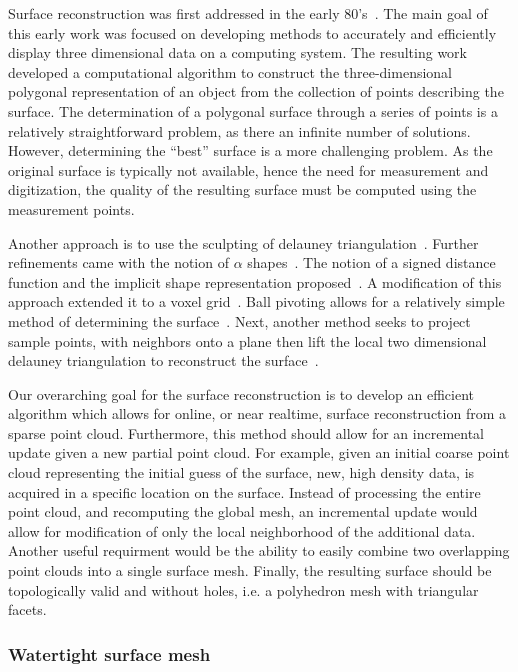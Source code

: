 Surface reconstruction was first addressed in the early 80's~\cite{uselton1983,uselton1981}.
The main goal of this early work was focused on developing methods to accurately and efficiently display three dimensional data on a computing system.
The resulting work developed a computational algorithm to construct the three-dimensional polygonal representation of an object from the collection of points describing the surface.
The determination of a polygonal surface through a series of points is a relatively straightforward problem, as there an infinite number of solutions.
However, determining the ``best'' surface is a more challenging problem.
As the original surface is typically not available, hence the need for measurement and digitization, the quality of the resulting surface must be computed using the measurement points.

Another approach is to use the sculpting of delauney triangulation~\cite{boissonnat1984}.
Further refinements came with the notion of \( \alpha \) shapes~\cite{edelsbrunner1994}.
The notion of a signed distance function and the implicit shape representation proposed~\cite{hoppe1992}.
A modification of this approach extended it to a voxel grid~\cite{curless1996}.
Ball pivoting allows for a relatively simple method of determining the surface~\cite{bernardini1999}.
Next, another method seeks to project sample points, with neighbors onto a plane then lift the local two dimensional delauney triangulation to reconstruct the surface~\cite{gopi2000}.

Our overarching goal for the surface reconstruction is to develop an efficient algorithm which allows for online, or near realtime, surface reconstruction from a sparse point cloud.
Furthermore, this method should allow for an incremental update given a new partial point cloud.
For example, given an initial coarse point cloud representing the initial guess of the surface, new, high density data, is acquired in a specific location on the surface.
Instead of processing the entire point cloud, and recomputing the global mesh, an incremental update would allow for modification of only the local neighborhood of the additional data.
Another useful requirment would be the ability to easily combine two overlapping point clouds into a single surface mesh.
Finally, the resulting surface should be topologically valid and without holes, i.e. a polyhedron mesh with triangular facets.

\subsubsection{Watertight surface mesh}


